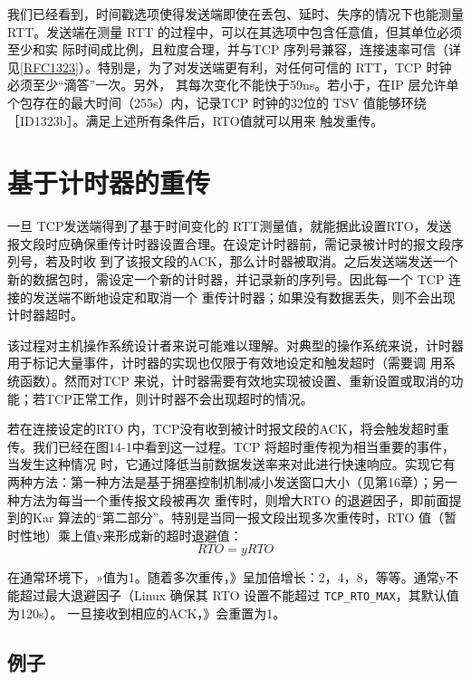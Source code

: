 我们已经看到，时间戳选项使得发送端即使在丢包、延时、失序的情况下也能测量RTT。发送端在测量 RTT 的过程中，可以在其选项中包含任意值，但其单位必须至少和实
际时间成比例，且粒度合理，并与TCP
序列号兼容，连接速率可信（详见\href{https://www.rfc-editor.org/rfc/rfc1323}{[RFC1323]}）。特别是，为了对发送端更有利，对任何可信的
RTT，TCP 时钟必须至少“滴答”一次。另外，
其每次变化不能快于59ns。若小于，在IP 层允许单个包存在的最大时间（255s）内，记录TCP 时钟的32位的 TSV
值能够环绕［ID1323b］。满足上述所有条件后，RTO值就可以用来
触发重传。

\section{基于计时器的重传}
一旦 TCP发送端得到了基于时间变化的
RTT测量值，就能据此设置RTO，发送报文段时应确保重传计时器设置合理。在设定计时器前，需记录被计时的报文段序列号，若及时收
到了该报文段的ACK，那么计时器被取消。之后发送端发送一个新的数据包时，需设定一个新的计时器，并记录新的序列号。因此每一个 TCP
连接的发送端不断地设定和取消一个
重传计时器；如果没有数据丢失，则不会出现计时器超时。

\begin{tcolorbox}
该过程对主机操作系统设计者来说可能难以理解。对典型的操作系统来说，计时器用于标记大量事件，计时器的实现也仅限于有效地设定和触发超时（需要调
用系统函数）。然而对TCP 来说，计时器需要有效地实现被设置、重新设置或取消的功能；若TCP正常工作，则计时器不会出现超时的情况。
\end{tcolorbox}

若在连接设定的RTO 内，TCP没有收到被计时报文段的ACK，将会触发超时重传。我们已经在图14-1中看到这一过程。TCP
将超时重传视为相当重要的事件，当发生这种情况
时，它通过降低当前数据发送率来对此进行快速响应。实现它有两种方法：第一种方法是基于拥塞控制机制减小发送窗口大小（见第16章）；另一种方法为每当一个重传报文段被再次
重传时，则增大RTO 的退避因子，即前面提到的Kar 算法的“第二部分”。特别是当同一报文段出现多次重传时，RTO 值（暂时性地）乘上值y来形成新的超时退避值：
\begin{equation}
RTO = yRTO
\end{equation}

在通常环境下，»值为1。随着多次重传，》呈加倍增长：2，4，8，等等。通常y不能超过最大退避因子（Linux 确保其 RTO 设置不能超过
\verb|TCP_RTO_MAX|，其默认值为120s）。
一旦接收到相应的ACK，》会重置为1。

\subsection{例子}

